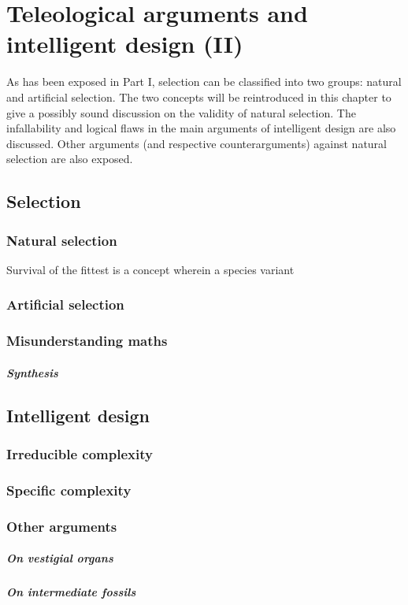 \chapter{Teleological arguments and intelligent design (II)}

\lipsum[17]

As has been exposed in Part I, selection can be classified into two groups: natural and artificial selection.
The two concepts will be reintroduced in this chapter to give a possibly sound discussion on the validity of natural selection.
The infallability and logical flaws \footnotemark in the main arguments of intelligent design are also discussed.
Other arguments (and respective counterarguments) against natural selection are also exposed.

\section{Selection}
\subsection{Natural selection}
Survival of the fittest is a concept wherein a species variant 

\subsection{Artificial selection}

\subsection{Misunderstanding maths}

\paragraph{Synthesis}


\section{Intelligent design}
\subsection{Irreducible complexity}


\subsection{Specific complexity}


\subsection{Other arguments}
\paragraph{On vestigial organs}

\paragraph{On intermediate fossils}
